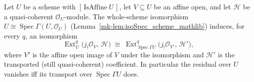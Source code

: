 \begin{lemma}
  \label{mk-lem:modules_isoSpec_ext_transport}

  Let \(U\) be a scheme with \([\,\mathrm{IsAffine}\ U\,]\), let \(V \subseteq U\) be an affine open,
  and let \(\mathcal{H}\) be a quasi-coherent \(\mathcal{O}_U\)-module. The whole-scheme isomorphism
  \(U \cong \operatorname{Spec}\Gamma(U, \mathcal{O}_U)\) (Lemma~\ref{mk-lem:isoSpec_scheme_mathlib})
  induces, for every \(q\), an isomorphism
  \[
    \operatorname{Ext}^q_{U}\bigl(j_!\mathcal{O}_V,\, \mathcal{H}\bigr)
      \;\cong\;
    \operatorname{Ext}^q_{\operatorname{Spec}\Gamma U}\bigl(j_!\mathcal{O}_{V'},\, \mathcal{H}'\bigr),
  \]
  where \(V'\) is the affine open image of \(V\) under the isomorphism and \(\mathcal{H}'\) is the
  transported (still quasi-coherent) coefficient. In particular the residual over \(U\) vanishes iff
  its transport over \(\operatorname{Spec}\Gamma U\) does.
\end{lemma}
